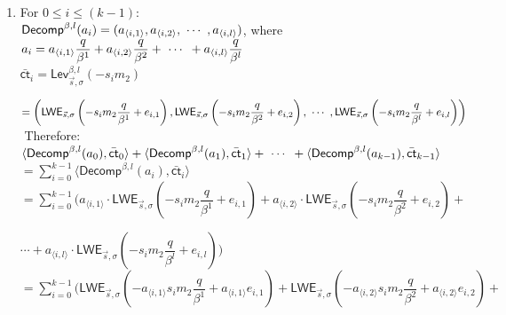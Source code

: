 \begin{myproof}
\begin{enumerate}
\item For $0 \leq i \leq (k - 1)$: \\
$\textsf{Decomp}^{\beta, l}(a_i) = (a_{\langle i, 1 \rangle}, a_{\langle i, 2 \rangle}, \text{ } \text{$\cdots$} \text{ }, a_{\langle i, l \rangle})$, where $a_i = a_{\langle i, 1 \rangle}\dfrac{q}{\beta^1} + a_{\langle i, 2 \rangle}\dfrac{q}{\beta^2} + \text{ } \text{$\cdots$} \text{ } + a_{\langle i, l \rangle}\dfrac{q}{\beta^l}$ \\
$\bar{\textsf{ct}}_i =  \textsf{Lev}_{\vec{s}, \sigma}^{\beta, l}(-s_im_2) $

$= \left(\textsf{LWE}_{\vec{s}, \sigma}\left(-s_im_2\dfrac{q}{\beta^1} + e_{i, 1}\right), \textsf{LWE}_{\vec{s}, \sigma}\left(-s_im_2\dfrac{q}{\beta^2} + e_{i, 2}\right), \text{ } \text{$\cdots$} \text{ }, \textsf{LWE}_{\vec{s}, \sigma}\left(-s_im_2\dfrac{q}{\beta^l} + e_{i, l}\right) \right)$ \\

$ $
Therefore: \\
$\langle \textsf{Decomp}^{\beta, l}(a_0), \bar{\textsf{ct}}_0 \rangle + \langle \textsf{Decomp}^{\beta, l}(a_1), \bar{\textsf{ct}}_1 \rangle + \text{ } \text{$\cdots$} \text{ } + \langle \textsf{Decomp}^{\beta, l}(a_{k-1}), \bar{\textsf{ct}}_{k-1} \rangle$ \\
$= \sum\limits_{i=0}^{k-1}\langle \textsf{Decomp}^{\beta, l}(a_i), \bar{\textsf{ct}}_i \rangle$ \\
$= \sum\limits_{i=0}^{k-1}\Bigg(a_{\langle i, 1\rangle} \cdot \textsf{LWE}_{\vec{s}, \sigma}\left(-s_im_2\dfrac{q}{\beta^1} + e_{i,1}\right) + a_{\langle i, 2\rangle} \cdot \textsf{LWE}_{\vec{s}, \sigma}\left(-s_im_2\dfrac{q}{\beta^2} + e_{i,2}\right) + $

$ \cdots +  a_{\langle i, l\rangle} \cdot \textsf{LWE}_{\vec{s}, \sigma}\left(-s_im_2\dfrac{q}{\beta^l} + e_{i,l}\right)\Bigg)$ \\
$= \sum\limits_{i=0}^{k-1}\Bigg(\textsf{LWE}_{\vec{s}, \sigma}\left(-a_{\langle i, 1\rangle}s_im_2\dfrac{q}{\beta^1} + a_{\langle i, 1 \rangle}e_{i,1}\right) + \textsf{LWE}_{\vec{s}, \sigma}\left(-a_{\langle i, 2\rangle}s_im_2\dfrac{q}{\beta^2} + a_{\langle i, 2 \rangle}e_{i,2}\right) + $


\end{enumerate}
\end{myproof}

